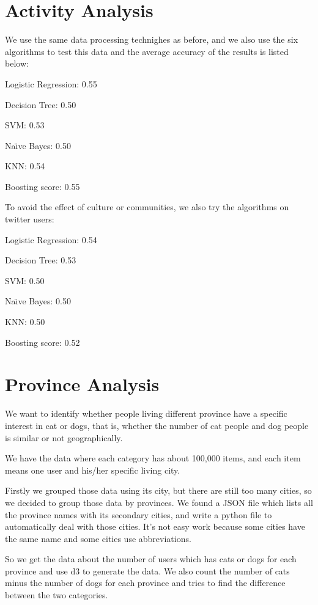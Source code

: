 \documentclass[12pt]{article}
\begin{document}
\section{Activity Analysis}

We use the same data processing technighes as before, and we also use the six algorithms to test this data and the average accuracy of the results is listed below:

Logistic Regression:  0.55

Decision Tree:  0.50

SVM:  0.53

Na\"{\i}ve Bayes:  0.50

KNN:  0.54

Boosting score:  0.55

To avoid the effect of culture or communities, we also try the algorithms on twitter users:

Logistic Regression:  0.54

Decision Tree:  0.53

SVM:  0.50

Na\"{\i}ve Bayes:  0.50

KNN:  0.50

Boosting score:  0.52

\section{Province Analysis}

We want to identify whether people living different province have a specific interest in cat or dogs, that is, whether the number of cat people and dog people is similar or not geographically.

We have the data where each category has about 100,000 items, and each item means one user and his/her specific living city.

Firstly we grouped those data using its city, but there are still too many cities, so we decided to group those data by provinces. We found a JSON file which lists all the province names with its secondary cities, and write a python file to automatically deal with those cities. It's not easy work because some cities have the same name and some cities use abbreviations.

So we get the data about the number of users which has cats or dogs for each province and use d3 to generate the data. We also count the number of cats minus the number of dogs for each province and tries to find the difference between the two categories.
\end{document}
